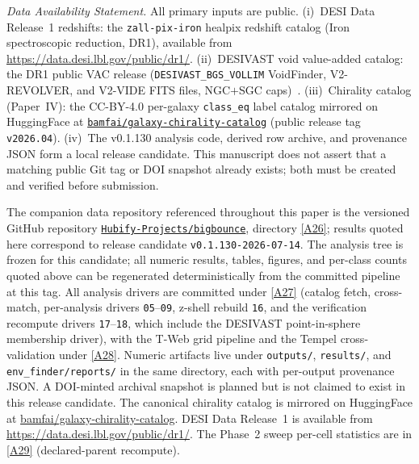 \documentclass[aps,prd,twocolumn,superscriptaddress,showpacs,preprintnumbers,nofootinbib,longbibliography,floatfix]{revtex4-2}
\newcommand{\repoBase}{https://github.com/Hubify-Projects/bigbounce/blob/main}
\newcommand{\paperVersion}{v0.1.130-2026-07-14}
\begin{document}
\emph{Data Availability Statement.} All primary inputs are public.
(i)~DESI Data Release~1 redshifts: the \texttt{zall-pix-iron} healpix
redshift catalog (Iron spectroscopic reduction, DR1), available from
\url{https://data.desi.lbl.gov/public/dr1/}.
(ii)~DESIVAST void value-added catalog: the DR1 public VAC release
(\texttt{DESIVAST\_BGS\_VOLLIM} VoidFinder, V2-REVOLVER, and V2-VIDE
FITS files, NGC$+$SGC caps)~\cite{DESIVAST2025}.
(iii)~Chirality catalog (Paper~IV): the CC-BY-4.0 per-galaxy
\texttt{class\_eq} label catalog mirrored on HuggingFace at
\href{https://huggingface.co/datasets/bamfai/galaxy-chirality-catalog}%
{\texttt{bamfai/galaxy-chirality-catalog}} (public release tag
\texttt{v2026.04}).
(iv)~The v0.1.130 analysis code, derived row archive, and provenance JSON
form a local release candidate. This manuscript does not assert that a
matching public Git tag or DOI snapshot already exists; both must be
created and verified before submission.

The companion data repository referenced throughout this paper is the
versioned GitHub repository
\href{https://github.com/Hubify-Projects/bigbounce}%
{\texttt{Hubify-Projects/bigbounce}}, directory
\href{\repoBase/pipelines/p5\_desi\_chirality/}{[A26]}; results quoted here
correspond to release candidate \texttt{\paperVersion}. The analysis
tree is frozen for this candidate; all numeric results, tables,
figures, and per-class counts quoted above can be regenerated
deterministically from the committed pipeline at this tag. All analysis
drivers are committed under
\href{\repoBase/pipelines/p5\_desi\_chirality/scripts/}{[A27]} (catalog fetch,
cross-match, per-analysis drivers \texttt{05}--\texttt{09}, z-shell
rebuild \texttt{16}, and the verification recompute drivers
\texttt{17}--\texttt{18}, which include the DESIVAST point-in-sphere
membership driver), with the T-Web grid pipeline and the Tempel
cross-validation under
\href{\repoBase/pipelines/p5\_desi\_chirality/env\_finder/}{[A28]}. Numeric
artifacts live under \texttt{outputs/}, \texttt{results/}, and
\texttt{env\_finder/reports/} in the same directory, each with
per-output provenance JSON. A DOI-minted archival snapshot is planned
but is not claimed to exist in this release candidate. The canonical chirality
catalog is mirrored on HuggingFace at
\href{https://huggingface.co/datasets/bamfai/galaxy-chirality-catalog}%
{bamfai/galaxy-chirality-catalog}. DESI Data Release~1 is available from
\url{https://data.desi.lbl.gov/public/dr1/}. The Phase~2 sweep
per-cell statistics are in
\href{\repoBase/pipelines/p5\_desi\_chirality/env\_finder/reports/02\_phase2\_sweep.csv}{[A29]}
(declared-parent recompute).
\end{document}
